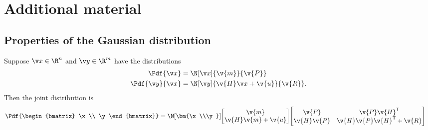 \section{Additional material}
\subsection{Properties of the Gaussian distribution}
\begin{lemma} \label{lemma:gaussian_joint}
Suppose $\x\in\R^n$ and $\y\in\R^m$ have the distributions
\begin{align*}
	\Pdf{\x}&= \N[\x]{\v{m}}{\v{P}} \\
	\Pdf{\y}{\x}&= \N[\y]{\v{H}\x+\v{u}}{\v{R}}.
\end{align*}
Then the joint distribution is
\begin{align*}
	\Pdf{\begin{bmatrix}
		\x\\
		\y
	\end{bmatrix}}&=
	\N[\bm{\x\\\y}]{
	\begin{bmatrix}
		\v{m}\\
		\v{H}\v{m}+\v{u}
	\end{bmatrix}
	}{
	\begin{bmatrix}
		\v{P}&\v{P}\v{H}^\tr\\
		\v{H}\v{P}&\v{H}\v{P}\v{H}^\tr+\v{R}\\
	\end{bmatrix}
	}
\end{align*}
\end{lemma}
